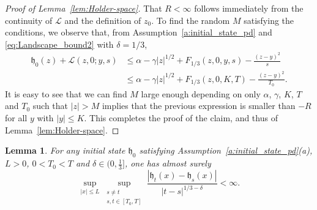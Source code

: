\documentclass[oneside,final,11pt]{amsart}
\newtheorem{lem}[thm]{Lemma}
\theoremstyle{definition}
\newcommand{\fh}{\mathfrak{h}}
\newcommand{\1}[1]{\mathbf{1}_{#1}}
\newcommand{\mc}{\mathcal}
\numberwithin{equation}{section}
\begin{document}
\begin{proof}[Proof of Lemma~\ref{lem:Holder-space}]
That $R<\infty$ follows immediately from the continuity of $\mc L$ and the definition of $z_0$. To find the random $M$ satisfying the conditions, we observe that, from Assumption~\ref{a:initial_state_pd} and \eqref{eq:Landscape_bound2} with $\delta=1/3$,
%
\begin{align*}
\fh_0(z)+\mc L(z,0;y,s) &\leq \alpha-\gamma |z|^{1/2} + F_{1/3}(z,0,y,s) - \frac{(z-y)^2}{s}\\
%
&\leq \alpha-\gamma |z|^{1/2} + F_{1/3}(z,0,K,T) - \frac{(z-y)^2}{T_0}.
\end{align*}
%
It is easy to see that we can find $M$ large enough depending on only $\alpha$, $\gamma$, $K$, $T$ and $T_0$ such that $|z| > M$ implies that the previous expression is smaller than $-R$  for all $y$ with $|y|\leq K$. This completes the proof of the claim, and thus of  Lemma~\ref{lem:Holder-space}.
\end{proof}

\begin{lem}\label{lem:Holder-time}
For any initial state $\fh_0$ satisfying Assumption~\ref{a:initial_state_pd}(a), $L > 0$,  $0 < T_0 < T$ and  $\delta\in (0,\tfrac13]$, one has almost surely
\begin{equation}
	\sup_{|x| \leq L}\sup_{\substack{s \neq t\\ s,t \in [T_0, T]}} \frac{|\fh_t(x) - \fh_s(x)|}{|t - s|^{1/3-\delta}} < \infty.
\end{equation}
\end{lem}
\end{document}
